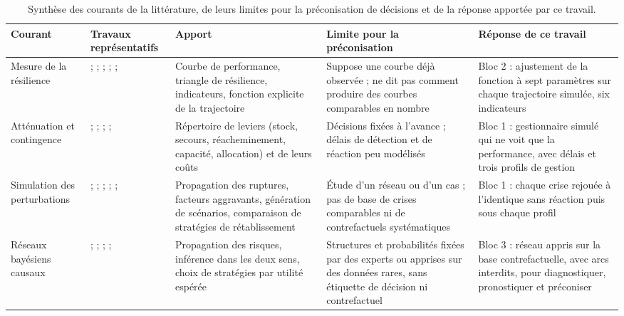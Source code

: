 \begin{table}[htbp]
\caption{Synthèse des courants de la littérature, de leurs limites pour la préconisation de décisions et de la réponse apportée par ce travail.}
\label{tab:synthese}
\footnotesize
\begin{tabularx}{\textwidth}{@{}>{\raggedright\arraybackslash}p{1.9cm}>{\raggedright\arraybackslash}p{3.3cm}LLL@{}}
\toprule
\textbf{Courant} & \textbf{Travaux représentatifs} & \textbf{Apport} & \textbf{Limite pour la préconisation} & \textbf{Réponse de ce travail} \\
\midrule
Mesure de la résilience
  & \citealp{bruneau2003}; \citealp{sheffirice2005}; \citealp{henry2012}; \citealp{spiegler2012}; \citealp{behzadi2020}; \citealp{rahiel2026in4pl}
  & Courbe de performance, triangle de résilience, indicateurs, fonction explicite de la trajectoire
  & Suppose une courbe déjà observée ; ne dit pas comment produire des courbes comparables en nombre
  & Bloc 2 : ajustement de la fonction à sept paramètres sur chaque trajectoire simulée, six indicateurs \\
\addlinespace
Atténuation et contingence
  & \citealp{tang2006}; \citealp{tomlin2006}; \citealp{lucker2019}; \citealp{ivanov2016tre}; \citealp{aldrighetti2021}
  & Répertoire de leviers (stock, secours, réacheminement, capacité, allocation) et de leurs coûts
  & Décisions fixées à l'avance ; délais de détection et de réaction peu modélisés
  & Bloc 1 : gestionnaire simulé qui ne voit que la performance, avec délais et trois profils de gestion \\
\addlinespace
Simulation des perturbations
  & \citealp{schmitt2012}; \citealp{ivanov2017}; \citealp{macdonald2018}; \citealp{klibi2012ejor}; \citealp{ramzy2022}; \citealp{zhang2026isomorph}
  & Propagation des ruptures, facteurs aggravants, génération de scénarios, comparaison de stratégies de rétablissement
  & Étude d'un réseau ou d'un cas ; pas de base de crises comparables ni de contrefactuels systématiques
  & Bloc 1 : chaque crise rejouée à l'identique sans réaction puis sous chaque profil \\
\addlinespace
Réseaux bayésiens causaux
  & \citealp{garvey2015}; \citealp{ojha2018}; \citealp{qazi2018}; \citealp{hosseiniivanov2020}; \citealp{hosseiniivanov2022aor}
  & Propagation des risques, inférence dans les deux sens, choix de stratégies par utilité espérée
  & Structures et probabilités fixées par des experts ou apprises sur des données rares, sans étiquette de décision ni contrefactuel
  & Bloc 3 : réseau appris sur la base contrefactuelle, avec arcs interdits, pour diagnostiquer, pronostiquer et préconiser \\
\bottomrule
\end{tabularx}
\end{table}